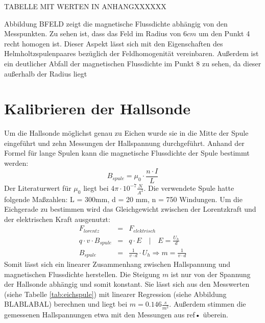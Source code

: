 TABELLE MIT WERTEN IN ANHANGXXXXXX

Abbildung BFELD zeigt die magnetische Flussdichte abhängig von den Messpunkten. Zu sehen ist, dass das Feld im Radius von $6 cm$ um den Punkt 4 recht homogen ist. Dieser Aspekt lässt sich mit den Eigenschaften des Helmholtzspulenpaares bezüglich der Feldhomogenität vereinbaren. Außerdem ist ein deutlicher Abfall der magnetischen Flussdichte im Punkt 8 zu sehen, da dieser außerhalb der Radius liegt

\section{Kalibrieren der Hallsonde}
Um die Hallsonde möglichst genau zu Eichen wurde sie in die Mitte der Spule eingeführt und zehn Messungen der Hallspannung durchgeführt. Anhand der Formel für lange Spulen kann die magnetische Flussdichte der Spule bestimmt werden:
\begin{equation*}
B_{spule} = \mu_0 \cdot \frac{n \cdot I}{L}
\end{equation*}
Der Literaturwert für $\mu_0$ liegt bei $4\pi \cdot 10^{-7} \frac{N}{A^2}$.
\newline
Die verwendete Spule hatte folgende Maßzahlen: L = 300mm, d = 20 mm, n = 750 Windungen.
\newline
Um die Eichgerade zu bestimmen wird das Gleichgewicht zwischen der Lorentzkraft und der elektrischen Kraft ausgenutzt:
\begin{eqnarray*}
F_{lorentz} &=& F_{elektrisch} \\
q \cdot v \cdot B_{spule} &=& q \cdot E \quad | \quad E = \frac{U_h}{d}\\
B_{spule} &=&\frac{1}{v \cdot d} \cdot U_h \Rightarrow m = \frac{1}{v \cdot d}
\end{eqnarray*}
Somit lässt sich ein linearer Zusammenhang zwischen Hallspannung und magnetischen Flussdichte herstellen. Die Steigung $m$ ist nur von der Spannung der Hallsonde abhängig und somit konstant. 
\newline
Sie lässt sich aus den Messwerten (siehe Tabelle \ref{tab:eichspule}) mit linearer Regression (siehe Abbildung BLABLABAL) berechnen und liegt bei $m = 0.146 \frac{s}{m^2}$. Außerdem stimmen die gemessenen Hallspannungen etwa mit den Messungen aus ref{•} überein.

